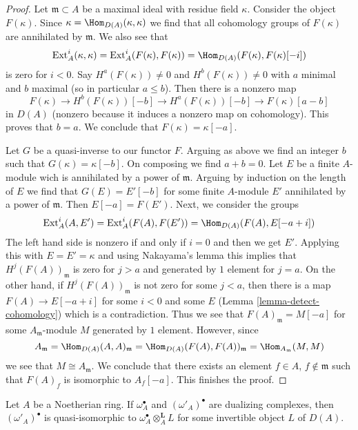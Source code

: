 \begin{proof}
Let $\mathfrak m \subset A$ be a maximal ideal with residue field $\kappa$.
Consider the object $F(\kappa)$. Since
$\kappa = \Hom_{D(A)}(\kappa, \kappa)$ we find that all
cohomology groups of $F(\kappa)$ are annihilated by $\mathfrak m$.
We also see that
$$
\text{Ext}^i_A(\kappa, \kappa) = \text{Ext}^i_A(F(\kappa), F(\kappa))
= \Hom_{D(A)}(F(\kappa), F(\kappa)[-i])
$$
is zero for $i < 0$. Say $H^a(F(\kappa)) \not = 0$ and
$H^b(F(\kappa)) \not = 0$ with $a$ minimal and $b$ maximal
(so in particular $a \leq b$). Then there is a nonzero map
$$
F(\kappa) \to H^b(F(\kappa))[-b] \to H^a(F(\kappa))[-b]
\to F(\kappa)[a - b]
$$
in $D(A)$ (nonzero because it induces a nonzero map on cohomology).
This proves that $b = a$. We conclude that $F(\kappa) = \kappa[-a]$.

\medskip\noindent
Let $G$ be a quasi-inverse to our functor $F$. Arguing as above
we find an integer $b$ such that $G(\kappa) = \kappa[-b]$.
On composing we find $a + b = 0$. Let $E$ be a finite $A$-module
wich is annihilated by a power of $\mathfrak m$. Arguing by
induction on the length of $E$ we find that $G(E) = E'[-b]$
for some finite $A$-module $E'$ annihilated by a power of
$\mathfrak m$. Then $E[-a] = F(E')$.
Next, we consider the groups
$$
\text{Ext}^i_A(A, E') = \text{Ext}^i_A(F(A), F(E')) =
\Hom_{D(A)}(F(A), E[-a + i])
$$
The left hand side is nonzero if and only if $i = 0$ and then
we get $E'$. Applying this with $E = E' = \kappa$ and using Nakayama's
lemma this implies that $H^j(F(A))_\mathfrak m$ is zero for $j > a$ and
generated by $1$ element for $j = a$. On the other hand, if
$H^j(F(A))_\mathfrak m$ is not zero for some $j < a$, then
there is a map $F(A) \to E[-a + i]$ for some $i < 0$ and some
$E$ (Lemma \ref{lemma-detect-cohomology}) which is a contradiction.
Thus we see that $F(A)_\mathfrak m = M[-a]$
for some $A_\mathfrak m$-module $M$ generated by $1$ element.
However, since
$$
A_\mathfrak m = \Hom_{D(A)}(A, A)_\mathfrak m =
\Hom_{D(A)}(F(A), F(A))_\mathfrak m = \Hom_{A_\mathfrak m}(M, M)
$$
we see that $M \cong A_\mathfrak m$. We conclude that there exists
an element $f \in A$, $f \not \in \mathfrak m$ such that
$F(A)_f$ is isomorphic to $A_f[-a]$. This finishes the proof.
\end{proof}

\begin{lemma}
\label{lemma-dualizing-unique}
Let $A$ be a Noetherian ring. If $\omega_A^\bullet$ and
$(\omega'_A)^\bullet$ are dualizing complexes, then
$(\omega'_A)^\bullet$ is quasi-isomorphic to
$\omega_A^\bullet \otimes_A^\mathbf{L} L$
for some invertible object $L$ of $D(A)$.
\end{lemma}

